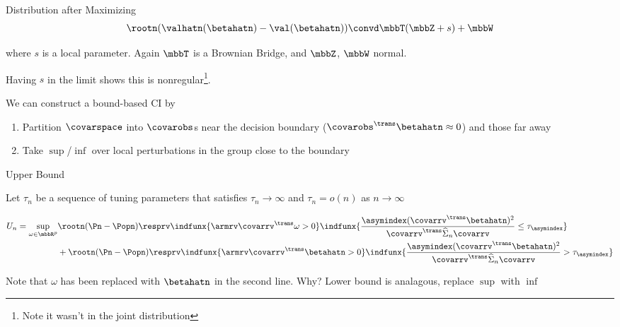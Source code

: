 \documentclass[aspectratio=169, professionalfonts]{beamer}
\begin{document}
\begin{frame}{Distribution after Maximizing}
	\begin{displaymath}
		\rootn (\valhatn (\betahatn) - \val(\betahatn)) \convd \mbbT(\mbbZ + s)
		+ \mbbW
	\end{displaymath}

	where $s$ is a local parameter. Again $\mbbT$ is a Brownian Bridge, and $\mbbZ$, $\mbbW$ normal.

	\vfill \pause
	Having $s$ in the limit shows this is nonregular\footnote{Note it wasn't in the
		joint distribution}.

	\vfill \pause
	We can construct a bound-based CI by
	\begin{enumerate}
		\item Partition $\covarspace$ into $\covarobs$s near the decision boundary
		      ($\covarobs^{\trans}\betahatn \approx 0$) and those far away
		      \vfill

		\item Take $\sup$/$\inf$ over local perturbations in the group close
		      to the boundary
	\end{enumerate}
	\vfill

\end{frame}
\begin{frame}{Upper Bound}
	\vfill

	Let $\tau_n$ be a sequence of tuning parameters that satisfies $\tau_n \to \infty$ and
	$\tau_n = o(n)$ as $n \to \infty$
	\vfill
	\large

	\begin{align*}
		U_n  = \sup_{\omega \in \mbbR^p} & \rootn(\Pn - \Popn)\resprv \indfunx{\armrv
			\covarrv^{\trans}\omega >
			0}\indfunx{\frac{\asymindex(\covarrv^{\trans}\betahatn)^2}{\covarrv^{\trans}\widehat{\Sigma}_n
		\covarrv} \leq \tau_{\asymindex}}                                               \\
		                                 & + \rootn(\Pn - \Popn)\resprv \indfunx{\armrv
			\covarrv^{\trans}\betahatn >
			0}\indfunx{\frac{\asymindex(\covarrv^{\trans}\betahatn)^2}{\covarrv^{\trans}\widehat{\Sigma}_n
				\covarrv} > \tau_{\asymindex}}
	\end{align*}
	\normalsize
	\vfill \pause

	Note that $\omega$ has been replaced with $\betahatn$ in the second line. Why?
	\vfill \pause
	Lower bound is analagous, replace $\sup$ with $\inf$
\end{frame}
\end{document}
